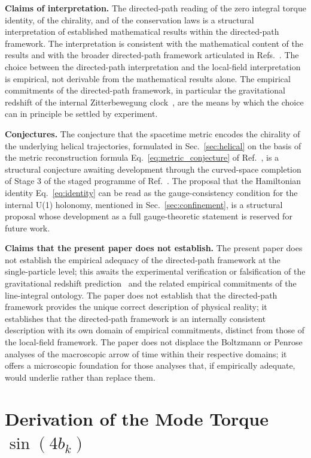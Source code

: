 \documentclass[%
 reprint, amsmath,amssymb, aps, prb, ]{revtex4-2}
\numberwithin{equation}{section}
\begin{document}
\textbf{Claims of interpretation.} The directed-path reading of the zero integral torque identity, of the chirality, and of the conservation laws is a structural interpretation of established mathematical results within the directed-path framework. The interpretation is consistent with the mathematical content of the results and with the broader directed-path framework articulated in Refs.~\cite{hanamura31, hanamura55}. The choice between the directed-path interpretation and the local-field interpretation is empirical, not derivable from the mathematical results alone. The empirical commitments of the directed-path framework, in particular the gravitational redshift of the internal Zitterbewegung clock~\cite{hanamura22, hanamura55}, are the means by which the choice can in principle be settled by experiment.

\textbf{Conjectures.} The conjecture that the spacetime metric encodes the chirality of the underlying helical trajectories, formulated in Sec.~\ref{sec:helical} on the basis of the metric reconstruction formula Eq.~\eqref{eq:metric_conjecture} of Ref.~\cite{hanamura51}, is a structural conjecture awaiting development through the curved-space completion of Stage 3 of the staged programme of Ref.~\cite{hanamura55}. The proposal that the Hamiltonian identity Eq.~\eqref{eq:identity} can be read as the gauge-consistency condition for the internal U(1) holonomy, mentioned in Sec.~\ref{sec:confinement}, is a structural proposal whose development as a full gauge-theoretic statement is reserved for future work.

\textbf{Claims that the present paper does not establish.} The present paper does not establish the empirical adequacy of the directed-path framework at the single-particle level; this awaits the experimental verification or falsification of the gravitational redshift prediction~\cite{hanamura22} and the related empirical commitments of the line-integral ontology. The paper does not establish that the directed-path framework provides the unique correct description of physical reality; it establishes that the directed-path framework is an internally consistent description with its own domain of empirical commitments, distinct from those of the local-field framework. The paper does not displace the Boltzmann or Penrose analyses of the macroscopic arrow of time within their respective domains; it offers a microscopic foundation for those analyses that, if empirically adequate, would underlie rather than replace them.


\section{Derivation of the Mode Torque $\sin(4 b_k)$}
\label{app:4bk}
\end{document}
